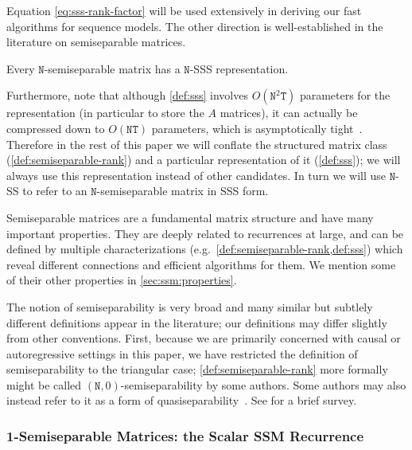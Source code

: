 Equation \eqref{eq:sss-rank-factor} will be used extensively in deriving our fast algorithms for sequence models. The other direction is well-established in the literature on semiseparable matrices.

\begin{proposition}
  \label{prop:sss}
  Every $\mathtt{N}$-semiseparable matrix has a $\mathtt{N}$-SSS representation.
\end{proposition}

Furthermore, note that although \ref{def:sss} involves $O(\mathtt{N}^2\mathtt{T})$ parameters for the representation (in particular to store the $A$ matrices), it can actually be compressed down to $O(\mathtt{NT})$ parameters, which is asymptotically tight~\citep{pernet2023exact}.
Therefore in the rest of this paper we will conflate the structured matrix class (\ref{def:semiseparable-rank}) and a particular representation of it (\ref{def:sss}); we will always use this representation instead of other candidates. In turn we will use $\mathtt{N}$-SS to refer to an $\mathtt{N}$-semiseparable matrix in SSS form.

Semiseparable matrices are a fundamental matrix structure and have many important properties. They are deeply related to recurrences at large, and can be defined by multiple characterizations (e.g.\ \ref{def:semiseparable-rank,def:sss}) which reveal different connections and efficient algorithms for them. We mention some of their other properties in \ref{sec:ssm:properties}.

\begin{remark}
  The notion of semiseparability is very broad and many similar but subtlely different definitions appear in the literature; our definitions may differ slightly from other conventions. First, because we are primarily concerned with causal or autoregressive settings in this paper, we have restricted the definition of semiseparability to the triangular case;
  \ref{def:semiseparable-rank} more formally might be called $(\mathtt{N},0)$-semiseparability by some authors. Some authors may also instead refer to it as a form of quasiseparability~\citep{eidelman1999new,pernet2016computing}.
  See \citep{vandebril2005bibliography} for a brief survey.
\end{remark}

\subsubsection{1-Semiseparable Matrices: the Scalar SSM Recurrence}
\label{sec:ssm:1-ss}

